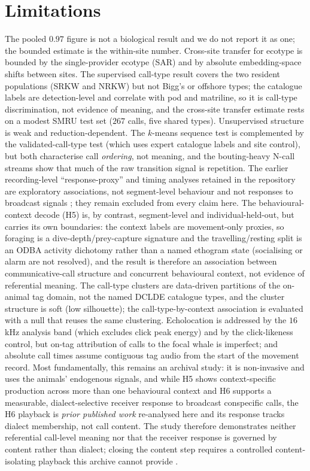 \documentclass[11pt]{article}
\begin{document}
\section{Limitations}
The pooled $0.97$ figure is not a biological result and we do not report it as one; the
bounded estimate is the within-site number. Cross-site transfer for ecotype is bounded by the
single-provider ecotype (SAR) and by absolute embedding-space shifts between sites. The
supervised call-type result covers the two resident populations (SRKW and NRKW) but not Bigg's
or offshore types; the catalogue labels are detection-level and correlate with pod and
matriline, so it is call-type discrimination, not evidence of meaning, and the cross-site
transfer estimate rests on a modest SMRU test set ($267$ calls, five shared types). Unsupervised structure is weak and reduction-dependent. The $k$-means sequence test is
complemented by the validated-call-type test (which uses expert catalogue labels and site
control), but both characterise call \emph{ordering}, not meaning, and the bouting-heavy
N-call streams show that much of the raw transition signal is repetition. The earlier
recording-level ``response-proxy'' and timing analyses retained in the repository are
exploratory associations, not segment-level behaviour and not responses to broadcast signals
\citep{wellard2020,wellard2020_appendix2}; they remain excluded from every claim here. The
behavioural-context decode (H5) is, by contrast, segment-level and individual-held-out, but
carries its own boundaries: the context labels are movement-only proxies, so foraging is a
dive-depth/prey-capture signature and the travelling/resting split is an ODBA activity
dichotomy rather than a named ethogram state (socialising or alarm are not resolved), and the
result is therefore an association between communicative-call structure and concurrent
behavioural context, not evidence of referential meaning. The call-type clusters are
data-driven partitions of the on-animal tag domain, not the named DCLDE catalogue types, and
the cluster structure is soft (low silhouette); the call-type-by-context association is evaluated
with a null that reuses the same clustering. Echolocation is addressed by the
$16$\,kHz analysis band (which excludes click peak energy) and by the click-likeness control,
but on-tag attribution of calls to the focal whale is imperfect; and absolute call times
assume contiguous tag audio from the start of the movement record. Most fundamentally, this
remains an archival study: it is non-invasive and uses the animals' endogenous signals, and
while H5 shows context-specific production across more than one behavioural context and H6
supports a measurable, dialect-selective receiver response to broadcast conspecific calls,
the H6 playback is \emph{prior published work} re-analysed here and its response tracks dialect
membership, not call content. The study therefore demonstrates neither referential call-level
meaning nor that the receiver response is governed by content rather than dialect; closing the
content step requires a controlled content-isolating playback this archive cannot provide
\citep{deecke2005,sayigh2025nsw}.
\end{document}
